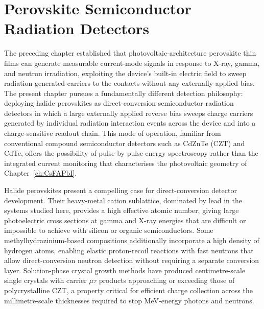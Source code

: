 
\chapter{Perovskite Semiconductor Radiation Detectors}
\label{ch:perovskite_detectors}

The preceding chapter established that photovoltaic-architecture
perovskite thin films can generate measurable current-mode signals
in response to X-ray, gamma, and neutron irradiation, exploiting
the device's built-in electric field to sweep radiation-generated
carriers to the contacts without any externally applied bias.  The
present chapter pursues a fundamentally different detection
philosophy: deploying halide perovskites as direct-conversion
semiconductor radiation detectors in which a large externally
applied reverse bias sweeps charge carriers generated by individual
radiation interaction events across the device and into a
charge-sensitive readout chain.  This mode of operation, familiar
from conventional compound semiconductor detectors such as
CdZnTe (CZT) and Cd\-Te, offers the possibility of pulse-by-pulse
energy spectroscopy rather than the integrated current monitoring
that characterises the photovoltaic geometry of
Chapter~\ref{ch:CsFAPbI}.

Halide perovskites present a compelling case for direct-conversion
detector development.  Their heavy-metal cation sublattice,
dominated by lead in the systems studied here, provides a high
effective atomic number, giving large photoelectric cross sections
at gamma and X-ray energies that are difficult or impossible to
achieve with silicon or organic semiconductors.  Some
methylhydrazinium-based compositions additionally incorporate a
high density of hydrogen atoms, enabling elastic proton-recoil
reactions with fast neutrons that allow direct-conversion neutron
detection without requiring a separate conversion layer.
Solution-phase crystal growth methods have produced
centimetre-scale single crystals with carrier $\mu\tau$ products
approaching or exceeding those of polycrystalline CZT, a property
critical for efficient charge collection across the
millimetre-scale thicknesses required to stop MeV-energy photons
and neutrons.

